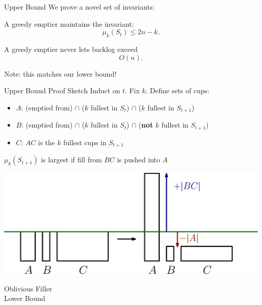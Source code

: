 \documentclass[xcolor=x11names, svgnames, rgb]{beamer}
\begin{document}
\begin{frame}[t]{Upper Bound}
  We prove a novel set of invariants:

  \begin{theorem}
    A greedy emptier maintains the invariant:
    $$\mu_k(S_t) \le 2n-k.$$
  \end{theorem}

  \begin{corollary}
  A greedy emptier never lets backlog exceed $$O(n).$$
  \end{corollary}

  \vspace{0.3cm}
  Note: this matches our lower bound!
\end{frame}

\begin{frame}[t]{Upper Bound Proof Sketch}
  Induct on $t$. Fix $k$. Define sets of cups:\\
  \begin{itemize}
    \item $A$: (emptied from) $\cap$ ($k$ fullest in $S_t$) $\cap$ ($k$ fullest in $S_{t+1}$)
    \item $B$: (emptied from) $\cap$ ($k$ fullest in $S_t$) $\cap$ (\textbf{not} $k$ fullest in $S_{t+1}$)
    \item $C$: $AC$ is the $k$ fullest cups in $S_{t+1}$
  \end{itemize}
  $\mu_k(S_{t+1})$ is largest if fill from $BC$ is pushed into $A$

  \vspace{0.25cm}
  \includegraphics[width=\linewidth]{upperbound/upperboundpf.eps}
\end{frame}

\begin{frame}[c]{}
  \begin{center}
    \Huge Oblivious Filler \\
    Lower Bound
  \end{center}
\end{frame}
\end{document}
